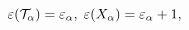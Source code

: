 \begin{equation}
\varepsilon({\cal T}_{\alpha})=\varepsilon_{\alpha},\;\varepsilon
(X_{\alpha})=\varepsilon_{\alpha}+1,\label{3.8}%
\end{equation}

